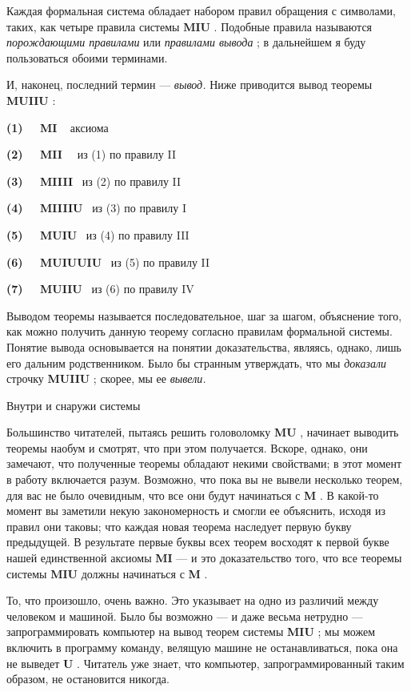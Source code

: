 Каждая формальная система обладает набором правил обращения с символами, таких, как четыре правила системы \textbf{MIU} . Подобные правила называются \emph{порождающими правилами} или \emph{правилами вывода} ; в дальнейшем я буду пользоваться обоими терминами.

И, наконец, последний термин --- \emph{вывод.} Ниже приводится вывод теоремы \textbf{MUIIU} :

\textbf{(1)~~ MI} ~ аксиома

\textbf{(2)~~ MII} ~~из (1) по правилу II

\textbf{(3)~~ MIIII} ~из (2) по правилу II

\textbf{(4)~~ MIIIIU} ~из (3) по правилу I

\textbf{(5)~~ MUIU} ~из (4) по правилу III

\textbf{(6)~~ MUIUUIU} ~из (5) по правилу II

\textbf{(7)~~ MUIIU} ~из (6) по правилу IV

Выводом теоремы называется последовательное, шаг за шагом, объяснение того, как можно получить данную теорему согласно правилам формальной системы. Понятие вывода основывается на понятии доказательства, являясь, однако, лишь его дальним родственником. Было бы странным утверждать, что мы \emph{доказали} строчку \textbf{MUIIU} ; скорее, мы ее \emph{вывели.}

Внутри и снаружи системы

Большинство читателей, пытаясь решить головоломку \textbf{MU} , начинает выводить теоремы наобум и смотрят, что при этом получается. Вскоре, однако, они замечают, что полученные теоремы обладают некими свойствами; в этот момент в работу включается разум. Возможно, что пока вы не вывели несколько теорем, для вас не было очевидным, что все они будут начинаться с \textbf{M} . В какой-то момент вы заметили некую закономерность и смогли ее объяснить, исходя из правил они таковы; что каждая новая теорема наследует первую букву предыдущей. В результате первые буквы всех теорем восходят к первой букве нашей единственной аксиомы \textbf{MI} --- и это доказательство того, что все теоремы системы \textbf{MIU} должны начинаться с \textbf{M} .

То, что произошло, очень важно. Это указывает на одно из различий между человеком и машиной. Было бы возможно --- и даже весьма нетрудно --- запрограммировать компьютер на вывод теорем системы \textbf{MIU} ; мы можем включить в программу команду, велящую машине не останавливаться, пока она не выведет \textbf{U} . Читатель уже знает, что компьютер, запрограммированный таким образом, не остановится никогда.

